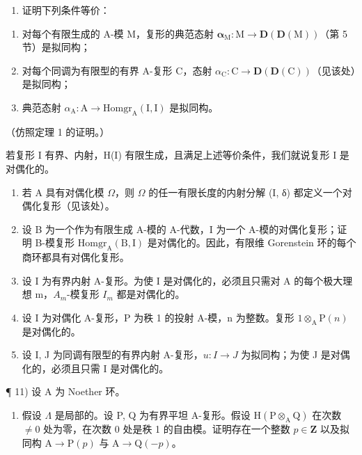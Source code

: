 \begin{enumerate}
\def\labelenumi{\alph{enumi})}
\tightlist
\item
  证明下列条件等价：
\end{enumerate}

\begin{enumerate}
\def\labelenumi{(\roman{enumi})}
\item
  对每个有限生成的 A-模 M，复形的典范态射 \(\boldsymbol{\alpha}_{\mathrm{M}}:\mathrm{M}\to\mathbf{D}(\mathbf{D}(\mathrm{M}))\)（第 5 节）是拟同构；
\item
  对每个同调为有限型的有界 A-复形 C，态射 \(\alpha_{\mathrm{C}}: \mathrm{C} \to \mathbf{D}(\mathbf{D}(\mathrm{C}))\)（见该处）是拟同构；
\item
  典范态射 \(\alpha_{\mathrm{A}}:\mathrm{A}\to \mathrm{Homgr}_{\mathrm{A}}(\mathrm{I},\mathrm{I})\) 是拟同构。
\end{enumerate}

（仿照定理 1 的证明。）

若复形 I 有界、内射，H(I) 有限生成，且满足上述等价条件，我们就说复形 I 是对偶化的。

\begin{enumerate}
\def\labelenumi{\alph{enumi})}
\setcounter{enumi}{1}
\item
  若 A 具有对偶化模 \(\Omega\)，则 \(\Omega\) 的任一有限长度的内射分解 (I, δ) 都定义一个对偶化复形（见该处）。
\item
  设 B 为一个作为有限生成 A-模的 A-代数，I 为一个 A-模的对偶化复形；证明 B-模复形 \(\mathrm{Homgr}_{\mathrm{A}}(\mathrm{B},\mathrm{I})\) 是对偶化的。因此，有限维 Gorenstein 环的每个商环都具有对偶化复形。
\item
  设 I 为有界内射 A-复形。为使 I 是对偶化的，必须且只需对 A 的每个极大理想 m，\(A_{m}\)-模复形 \(I_{m}\) 都是对偶化的。
\item
  设 I 为对偶化 A-复形，P 为秩 1 的投射 A-模，n 为整数。复形 \(1 \otimes_{\mathrm{A}} \mathrm{P}(n)\) 是对偶化的。
\item
  设 I, J 为同调有限型的有界内射 A-复形，\(u: I \rightarrow J\) 为拟同构；为使 J 是对偶化的，必须且只需 I 是对偶化的。
\end{enumerate}

¶ 11) 设 A 为 Noether 环。

\begin{enumerate}
\def\labelenumi{\alph{enumi})}
\tightlist
\item
  假设 \(\Lambda\) 是局部的。设 P, Q 为有界平坦 A-复形。假设 \(\mathrm{H}(\mathrm{P}\otimes_{\mathrm{A}}\mathrm{Q})\) 在次数 \(\neq 0\) 处为零，在次数 0 处是秩 1 的自由模。证明存在一个整数 \(p\in \mathbf{Z}\) 以及拟同构 \(\mathrm{A}\to \mathrm{P}(p)\) 与 \(\mathrm{A}\to \mathrm{Q}(-p)\)。
\end{enumerate}


